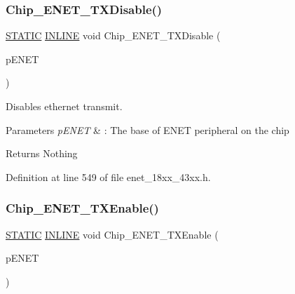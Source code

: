 \subsubsection{\texorpdfstring{Chip\+\_\+\+E\+N\+E\+T\+\_\+\+T\+X\+Disable()}{Chip\_ENET\_TXDisable()}}
{\footnotesize\ttfamily \hyperlink{group___l_p_c___types___public___macros_ga10b2d890d871e1489bb02b7e70d9bdfb}{S\+T\+A\+T\+IC} \hyperlink{spifi__18xx__43xx_8h_a2eb6f9e0395b47b8d5e3eeae4fe0c116}{I\+N\+L\+I\+NE} void Chip\+\_\+\+E\+N\+E\+T\+\_\+\+T\+X\+Disable (\begin{DoxyParamCaption}\item[{\hyperlink{struct_l_p_c___e_n_e_t___t}{L\+P\+C\+\_\+\+E\+N\+E\+T\+\_\+T} $\ast$}]{p\+E\+N\+ET }\end{DoxyParamCaption})}



Disables ethernet transmit. 


\begin{DoxyParams}{Parameters}
{\em p\+E\+N\+ET} & \+: The base of E\+N\+ET peripheral on the chip \\
\hline
\end{DoxyParams}
\begin{DoxyReturn}{Returns}
Nothing 
\end{DoxyReturn}


Definition at line 549 of file enet\+\_\+18xx\+\_\+43xx.\+h.

\mbox{\label{group___e_n_e_t__18_x_x__43_x_x_gacc7e455d4b168d2405b4ef9dda242488}} 
\subsubsection{\texorpdfstring{Chip\+\_\+\+E\+N\+E\+T\+\_\+\+T\+X\+Enable()}{Chip\_ENET\_TXEnable()}}
{\footnotesize\ttfamily \hyperlink{group___l_p_c___types___public___macros_ga10b2d890d871e1489bb02b7e70d9bdfb}{S\+T\+A\+T\+IC} \hyperlink{spifi__18xx__43xx_8h_a2eb6f9e0395b47b8d5e3eeae4fe0c116}{I\+N\+L\+I\+NE} void Chip\+\_\+\+E\+N\+E\+T\+\_\+\+T\+X\+Enable (\begin{DoxyParamCaption}\item[{\hyperlink{struct_l_p_c___e_n_e_t___t}{L\+P\+C\+\_\+\+E\+N\+E\+T\+\_\+T} $\ast$}]{p\+E\+N\+ET }\end{DoxyParamCaption})}



